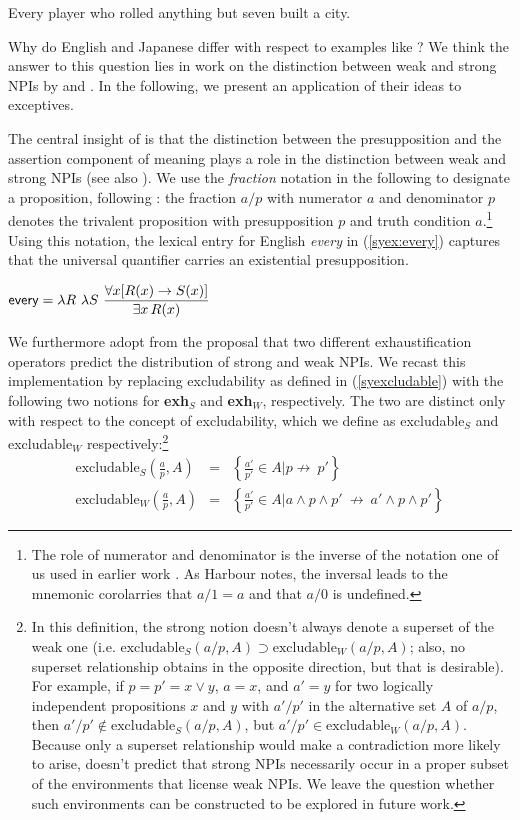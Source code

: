 \documentclass[output=paper]{langscibook}
\def\existsx{\ifmmode\mathop{\exists x}\else$\exists x$\xspace\fi}
\def\forallx{\ifmmode\mathop{\forall x}\else$\forall x$\xspace\fi}
\begin{document}
\ea \label{syex:butseven}
Every player who rolled anything but seven built a city.\z

Why do English and Japanese differ with respect to examples like ?
We think the answer to this question lies in work on the distinction between weak and strong NPIs by \citet{gajewski11a} and \citet{chierchia13a}.
In the following, we present an application of their ideas to exceptives.  

The central insight of \citet{gajewski11a} is that the distinction between the presupposition and the assertion component of meaning plays a role in the distinction between weak and strong NPIs (see also \citealt{homer08h}).
We use the \emph{fraction} notation in the following to designate a proposition, following \citet{harbour14a}: the fraction $a/p$ with numerator $a$ and denominator $p$ denotes the trivalent proposition with presupposition $p$ and truth condition $a$.\footnote{The role of numerator and denominator is the inverse of the notation one of us used in earlier work \citep{sauerland05f}. As Harbour notes, the inversal leads to the mnemonic corolarries that $a/1 = a$ and that $a/0$ is undefined.} Using this notation, the lexical entry for English \emph{every} in (\ref{syex:every}) captures that the universal quantifier carries an existential presupposition.

\ea \label{syex:every}
$\displaystyle \textsf{every} = \lambda R\ \lambda S\ \frac{\forallx [R(x) \rightarrow S(x)]}{\existsx R(x)}$\z

We furthermore adopt from \citet{chierchia13a} the proposal that two different exhaustification operators predict the distribution of strong and weak NPIs.
We recast this implementation by replacing excludability as defined in (\ref{syexcludable}) with the following two notions for \textbf{exh}$_{S}$ and \textbf{exh}$_W$, respectively.
The two are distinct only with respect to the concept of excludability, which we define as excludable$_S$ and excludable$_W$ respectively:\footnote{In this definition, the strong notion doesn't always denote a superset of the weak one (i.e. $\text{excludable}_S(a/p,A) \supset \text{excludable}_W(a/p,A)$; also, no superset relationship obtains in the opposite direction, but that is desirable). For example, if $p = p' = x \lor y$, $a = x$, and $a' = y$ for two logically independent propositions $x$ and $y$ with $a'/p'$ in the alternative set $A$ of $a/p$,  then
$a'/p' \not\in \text{excludable}_S(a/p,A)$, but  $a'/p' \in \text{excludable}_W(a/p,A)$. Because only a superset relationship would make a contradiction more likely to arise, \citet{chierchia13a} doesn't predict that strong NPIs necessarily occur in a proper subset of the environments that license weak NPIs. 
We leave the question whether such environments can be constructed to be explored in future work.}
\begin{eqnarray*}
\text{excludable}_S\left(\frac{a}{p},A\right) &=& \left\{\frac{a'}{p'} \in A \mathrel{\Big|}  p  \not\rightarrow\ p'\right\}\\[1ex]
\text{excludable}_W\left(\frac{a}{p},A\right) &=& \left\{\frac{a'}{p'} \in A \mathrel{\Big|}  a \land p \land p' \  \not\rightarrow\ a' \land p \land p'\right\}
\end{eqnarray*}
\end{document}
